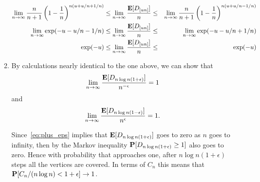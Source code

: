 \documentclass[11pt]{article} \usepackage{amssymb}
\newcommand{\E}{{\bf E}} \newcommand{\Cov}{{\bf Cov}}
\begin{document}
\begin{enumerate}
\begin{enumerate}
\begin{eqnarray*}
          \\ \lim_{n \to \infty}{n\over n+1}\left(1-{1\over n}\right)^{n(u+u/n+1/n)} &\leq \lim_{n \to \infty}{\E[D_{[un]}]\over n} \leq& \lim_{n \to \infty}{n\over n+1}\left(1-{1\over n}\right)^{n(u+u/n-1/n)}
          \\ \lim_{n \to \infty}\exp(-u-u/n-1/n) &\leq \lim_{n \to \infty}{\E[D_{[un]}]\over n} \leq& \lim_{n \to \infty}\exp(-u-u/n+1/n)
          \\ \exp(-u) &\leq \lim_{n \to \infty}{\E[D_{[un]}]\over n} \leq& \exp(-u)
        \end{eqnarray*}
      \item
        By calculations nearly identical to the one above, we can show that
        \begin{equation}
          \label{eq:plus_eps}
          \lim_{n\to\infty}{\E[D_{n\log n(1+\epsilon)}]\over n^{-\epsilon}}=1
        \end{equation}
        and
        \begin{equation}
          \label{eq:minus_eps}
          \lim_{n\to\infty}{\E[D_{n\log n(1-\epsilon)}]\over n^{\epsilon}}=1.
        \end{equation}
        
        Since~\eqref{eq:plus_eps} implies that $\E[D_{n\log n(1+\epsilon)}]$
        goes to zero as $n$ goes to infinity, then by the Markov
        inequality $\P[D_{n\log n(1+\epsilon)}\geq 1]$ also
        goes to zero. Hence with probability that approaches one, after
        $n\log n(1+\epsilon)$ steps all the vertices are covered. In terms
        of $C_n$ this means that
        $\P[C_n/(n\log n)<1+\epsilon]\to 1$.


\end{enumerate}
\end{enumerate}
\end{document}
